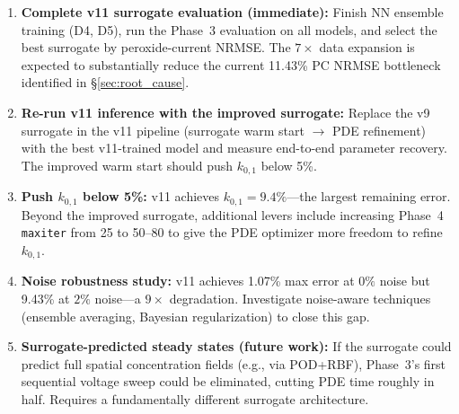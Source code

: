 \documentclass[11pt]{article}
\begin{document}
\begin{enumerate}
  \item \textbf{Complete v11 surrogate evaluation (immediate):} Finish
        NN ensemble training (D4, D5), run the Phase~3 evaluation on all
        models, and select the best surrogate by peroxide-current NRMSE.
        The $7\times$ data expansion is expected to substantially reduce
        the current 11.43\% PC NRMSE bottleneck identified in
        \S\ref{sec:root_cause}.

  \item \textbf{Re-run v11 inference with the improved surrogate:}
        Replace the v9 surrogate in the v11 pipeline (surrogate warm start
        $\to$ PDE refinement) with the best v11-trained model and measure
        end-to-end parameter recovery.  The improved warm start should
        push $k_{0,1}$ below 5\%.

  \item \textbf{Push $k_{0,1}$ below 5\%:} v11 achieves
        $k_{0,1} = 9.4\%$---the largest remaining error.  Beyond the
        improved surrogate, additional levers include increasing Phase~4
        \texttt{maxiter} from 25 to 50--80 to give the PDE optimizer more
        freedom to refine $k_{0,1}$.

  \item \textbf{Noise robustness study:} v11 achieves 1.07\% max error at
        $0\%$ noise but 9.43\% at $2\%$ noise---a $9\times$ degradation.
        Investigate noise-aware techniques (ensemble averaging, Bayesian
        regularization) to close this gap.

  \item \textbf{Surrogate-predicted steady states (future work):}  If the
        surrogate could predict full spatial concentration fields (e.g., via
        POD+RBF), Phase~3's first sequential voltage sweep could be
        eliminated, cutting PDE time roughly in half.  Requires a
        fundamentally different surrogate architecture.
\end{enumerate}
\end{document}

